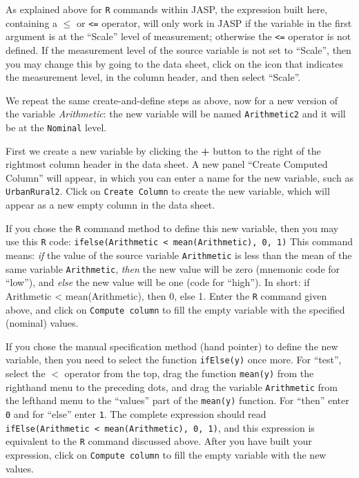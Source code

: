 \documentclass[
]{book}
\begin{document}
As explained above for \texttt{R} commands within JASP, the expression built here, containing a \(\leq\) or \texttt{\textless{}=} operator, will only work in JASP if the variable in the first argument is at the ``Scale'' level of measurement; otherwise the \texttt{\textless{}=} operator is not defined. If the measurement level of the source variable is not set to ``Scale'', then you may change this by going to the data sheet, click on the icon that indicates the measurement level, in the column header, and then select ``Scale''.

We repeat the same create-and-define steps as above, now for a new version of the variable \emph{Arithmetic}: the new variable will be named \texttt{Arithmetic2} and it will be at the \texttt{Nominal} level.

First we create a new variable by clicking the \textbf{+} button to the right of the rightmost column header in the data sheet. A new panel ``Create Computed Column'' will appear, in which you can enter a name for the new variable, such as \texttt{UrbanRural2}. Click on \texttt{Create\ Column} to create the new variable, which will appear as a new empty column in the data sheet.

If you chose the \texttt{R} command method to define this new variable, then you may use this \texttt{R} code: \texttt{ifelse(Arithmetic\ \textless{}\ mean(Arithmetic),\ 0,\ 1)}
This command means: \emph{if} the value of the source variable \texttt{Arithmetic} is less than the mean of the same variable \texttt{Arithmetic}, \emph{then} the new value will be zero (mnemonic code for ``low''), and \emph{else} the new value will be one (code for ``high''). In short: if Arithmetic \textless{} mean(Arithmetic), then 0, else 1. Enter the \texttt{R} command given above, and click on \texttt{Compute\ column} to fill the empty variable with the specified (nominal) values.

If you chose the manual specification method (hand pointer) to define the new variable, then you need to select the function \texttt{ifElse(y)} once more. For ``test'', select the \(<\) operator from the top, drag the function \texttt{mean(y)} from the righthand menu to the preceding dots, and drag the variable \texttt{Arithmetic} from the lefthand menu to the ``values'' part of the \texttt{mean(y)} function. For ``then'' enter \texttt{0} and for ``else'' enter \texttt{1}. The complete expression should read \texttt{ifElse(Arithmetic\ \textless{}\ mean(Arithmetic),\ 0,\ 1)}, and this expression is equivalent to the \texttt{R} command discussed above.
After you have built your expression, click on \texttt{Compute\ column} to fill the empty variable with the new values.
\end{document}
